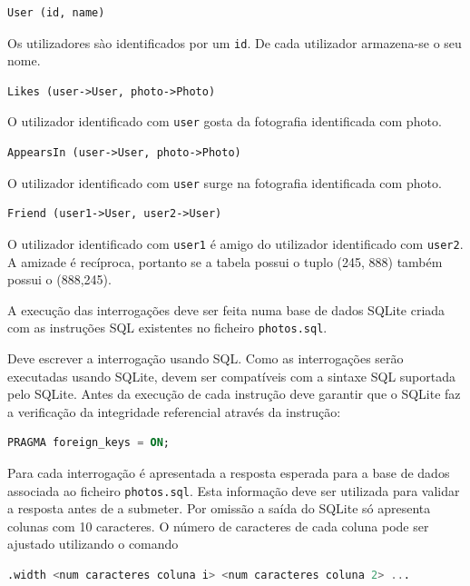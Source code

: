 {\begin{lstlisting}[numbers=none]
User (id, name)
\end{lstlisting}

Os utilizadores sào identificados por um \texttt{id}. De cada utilizador armazena-se o seu nome.

\begin{lstlisting}[numbers=none]
Likes (user->User, photo->Photo)
\end{lstlisting}

O utilizador identificado com \texttt{user} gosta da fotografia identificada com photo.

\begin{lstlisting}[numbers=none]
AppearsIn (user->User, photo->Photo)
\end{lstlisting}

O utilizador identificado com \texttt{user} surge na fotografia identificada com photo.

\begin{lstlisting}[numbers=none]
Friend (user1->User, user2->User)
\end{lstlisting}

O utilizador identificado com \texttt{user1} é amigo do utilizador identificado com \texttt{user2}. A amizade é recíproca, portanto se a tabela possui o tuplo (245, 888) também possui o (888,245).

A execução das interrogações deve ser feita numa base de dados SQLite criada com as instruções SQL existentes no ficheiro \texttt{photos.sql}.

Deve escrever a interrogação usando SQL. Como as interrogações serão executadas usando SQLite, devem ser compatíveis com a sintaxe SQL suportada pelo SQLite. Antes da execução de cada instrução deve garantir que o SQLite faz a verificação da integridade referencial através da instrução:

\begin{lstlisting}[language=SQL,numbers=none]
PRAGMA foreign_keys = ON;
\end{lstlisting}

Para cada interrogação é apresentada a resposta esperada para a base de dados associada ao ficheiro \texttt{photos.sql}. Esta informação deve ser utilizada para validar a resposta antes de a submeter. Por omissão a saída do SQLite só apresenta colunas com 10 caracteres. O número de caracteres de cada coluna pode ser ajustado utilizando o comando

\begin{lstlisting}[language=SQL,numbers=none]
.width <num caracteres coluna i> <num caracteres coluna 2> ...
\end{lstlisting}

}
